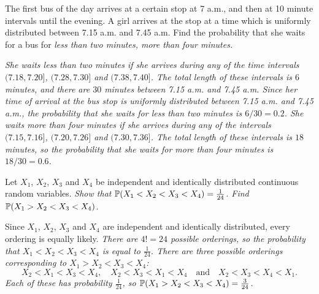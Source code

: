 \begin{exercise}
\begin{questions}
\question
The first bus of the day arrives at a certain stop at 7 a.m., and then at 10 minute intervals until the evening. A girl arrives at the stop at a time which is uniformly distributed between 7.15 a.m. and 7.45 a.m. Find the probability that she waits for a bus for
\ben
\it less than two minutes,
\it more than four minutes.
\een

\begin{answer}
\ben
\it %
She waits less than two minutes if she arrives during any of the time intervals $(7.18,7.20]$, $(7.28,7.30]$ and $(7.38,7.40]$. The total length of these intervals is $6$ minutes, and there are $30$ minutes between 7.15 a.m. and 7.45 a.m. Since her time of arrival at the bus stop is uniformly distributed between 7.15 a.m. and 7.45 a.m., the probability that she waits for less than two minutes is $6/30 = 0.2$.
\it %
She waits more than four minutes if she arrives during any of the intervals $(7.15,7.16]$, $(7.20,7.26]$ and $(7.30,7.36]$. The total length of these intervals is $18$ minutes, so the probability that she waits for more than four minutes is $18/30 = 0.6$.
\een
\end{answer}

\question
Let $X_1$, $X_2$, $X_3$ and $X_4$ be independent and identically distributed continuous random variables. 
\ben
\it Show that $\mathbb{P}(X_1 < X_2 < X_3 < X_4) = \frac{1}{24}$.
\it Find $\mathbb{P}(X_1 > X_2 < X_3 < X_4)$.
\een

\begin{answer}
Since $X_1$, $X_2$, $X_3$ and $X_4$ are independent and identically distributed, every ordering is equally likely. 
\ben
\it There are $4!=24$ possible orderings, so the probability that $X_1 < X_2 < X_3 < X_4$ is equal to $\frac{1}{24}$.
\it There are three possible orderings corresponding to $X_1 > X_2 < X_3 < X_4$:
\[
X_2 < X_1 < X_3 < X_4,\quad X_2 < X_3 < X_1 < X_4 \quad\text{and}\quad X_2 < X_3 < X_4 < X_1.
\]
Each of these has probability $\frac{1}{24}$, so $\mathbb{P}(X_1 > X_2 < X_3 < X_4) = \frac{3}{24}$.
\een

\end{answer}



\end{questions}
\end{exercise}
